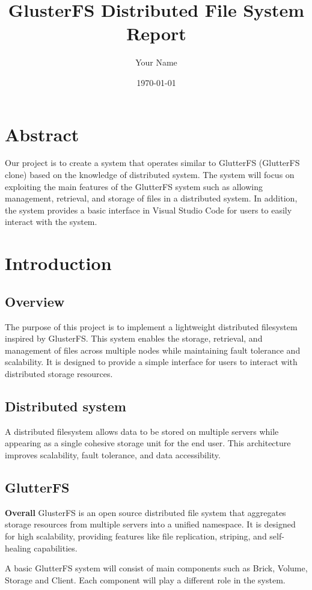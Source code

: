 \documentclass[a4paper,12pt]{article}
\title{GlusterFS Distributed File System Report}
\author{Your Name}
\date{\today}
\begin{document}
\maketitle

\tableofcontents

\newpage

\section{Abstract}
Our project is to create a system that operates similar to GlutterFS (GlutterFS clone) based on the knowledge of distributed system. The system will focus on exploiting the main features of the GlutterFS system such as allowing management, retrieval, and storage of files in a distributed system. In addition, the system provides a basic interface in Visual Studio Code for users to easily interact with the system.
\section{Introduction}
\subsection{Overview}
The purpose of this project is to implement a lightweight distributed filesystem inspired by GlusterFS. This system enables the storage, retrieval, and management of files across multiple nodes while maintaining fault tolerance and scalability. It is designed to provide a simple interface for users to interact with distributed storage resources.

\subsection{Distributed system  }
A distributed filesystem allows data to be stored on multiple servers while appearing as a single cohesive storage unit for the end user. This architecture improves scalability, fault tolerance, and data accessibility.
\subsection{GlutterFS}
\textbf{Overall}
GlusterFS is an open source distributed file system that aggregates storage resources from multiple servers into a unified namespace. It is designed for high scalability, providing features like file replication, striping, and self-healing capabilities. 

A basic GlutterFS system will consist of main components such as Brick, Volume, Storage and Client. Each component will play a different role in the system.
\end{document}
